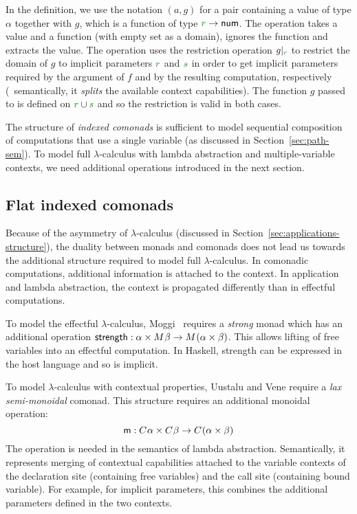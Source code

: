 \noindent
In the definition, we use the notation $(a, g)$ for a pair containing a value of type $\alpha$
together with $g$, which is a function of type $\cclrd{r} \rightarrow \ident{num}$. The  operation
takes a value and a function (with empty set as a domain), ignores the function and extracts the
value. The  operation uses the restriction operation $\restr{g}{\cclrd{r}}$ to
restrict the domain of $g$ to implicit parameters $\cclrd{r}$ and $\cclrd{s}$ in order to get
implicit parameters required by the argument of $f$ and by the resulting computation, respectively
(\ie~semantically, it \emph{splits} the available context capabilities). The function $g$ passed
to  is defined on $\cclrd{r} \cup \cclrd{s}$ and so the restriction is
valid in both cases.

The structure of \emph{indexed comonads} is sufficient to model sequential composition of
computations that use a single variable (as discussed in Section~\ref{sec:path-sem}). To model
full $\lambda$-calculus with lambda abstraction and multiple-variable contexts, we need
additional operations introduced in the next section.


\subsection{Flat indexed comonads}
\label{sec:semantics-flat-monoidal}

Because of the asymmetry of $\lambda$-calculus (discussed in Section~\ref{sec:applications-structure}),
the duality between monads and comonads does not lead us towards the additional structure
required to model full $\lambda$-calculus. In comonadic computations, additional information is attached
to the context. In application and lambda abstraction, the context is propagated differently than
in effectful computations.

To model the effectful $\lambda$-calculus, Moggi~\cite{monad-notions} requires a \emph{strong} monad which
has an additional operation $\textnormal{\sffamily strength} : \alpha\times M^{}\beta \rightarrow M^{}(\alpha\times\beta)$.
This allows lifting of free variables into an effectful computation. In Haskell, strength can be expressed
in the host language and so is implicit.

To model $\lambda$-calculus with contextual properties, Uustalu and Vene \cite{comonads-notions}
require a \emph{lax semi-monoidal} comonad. This structure requires an additional monoidal operation:
%
\begin{equation*}
\textnormal{\sffamily m} : C^{}\alpha \times C^{}\beta \rightarrow C^{}(\alpha \times \beta)
\end{equation*}
%
The  operation is needed in the semantics of lambda abstraction. Semantically, it represents
merging of contextual capabilities attached to the variable contexts of the declaration site (containing free variables)
and the call site (containing bound variable). For example, for implicit parameters, this combines
the additional parameters defined in the two contexts.

